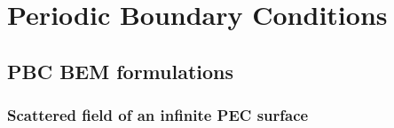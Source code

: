 \documentclass[letterpaper]{article}
\begin{document}
\newpage
\section{Periodic Boundary Conditions}

\subsection{PBC BEM formulations}

\subsubsection{Scattered field of an infinite PEC surface}
\end{document}
